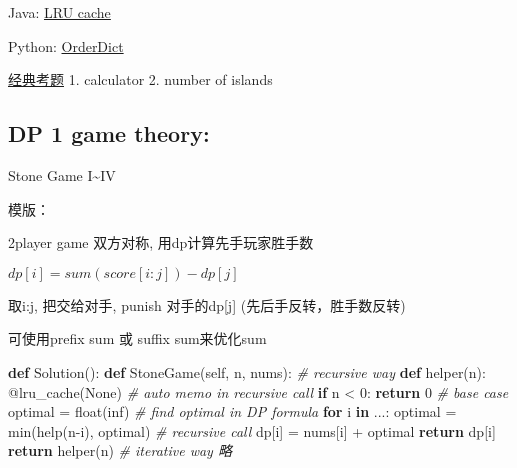 \documentclass[
]{article}
\author{}
\date{}
\newenvironment{Shaded}{}{}
\newcommand{\AttributeTok}[1]{\textcolor[rgb]{0.49,0.56,0.16}{#1}}
\newcommand{\BuiltInTok}[1]{#1}
\newcommand{\CommentTok}[1]{\textcolor[rgb]{0.38,0.63,0.69}{\textit{#1}}}
\newcommand{\ControlFlowTok}[1]{\textcolor[rgb]{0.00,0.44,0.13}{\textbf{#1}}}
\newcommand{\DecValTok}[1]{\textcolor[rgb]{0.25,0.63,0.44}{#1}}
\newcommand{\KeywordTok}[1]{\textcolor[rgb]{0.00,0.44,0.13}{\textbf{#1}}}
\newcommand{\NormalTok}[1]{#1}
\newcommand{\OperatorTok}[1]{\textcolor[rgb]{0.40,0.40,0.40}{#1}}
\newcommand{\StringTok}[1]{\textcolor[rgb]{0.25,0.44,0.63}{#1}}
\newcommand{\VariableTok}[1]{\textcolor[rgb]{0.10,0.09,0.49}{#1}}
\begin{document}
Java:
\href{https://medium.com/@krishankantsinghal/my-first-blog-on-medium-583159139237}{LRU
cache}

Python:
\href{https://docs.python.org/3/library/collections.html\#ordereddict-objects}{OrderDict}

\href{https://www.youtube.com/watch?v=qNRKPnOaUQE\&list=PLbaIOC0vpjNUg3b9zH14ikdknckN9hMMl}{经典考题}
1. calculator 2. number of islands

\hypertarget{dp-1-game-theory}{%
\subsection{\texorpdfstring{DP 1 game theory:
}{DP 1 game theory: }}\label{dp-1-game-theory}}

Stone Game I\textasciitilde IV

模版：

2player game 双方对称, 用dp计算先手玩家胜手数

\(dp[i] = sum(score[i:j]) - dp[j]\)

取i:j, 把交给对手, punish 对手的dp{[}j{]} (先后手反转，胜手数反转)

可使用prefix sum 或 suffix sum来优化sum

\begin{Shaded}
\begin{Highlighting}[]
\KeywordTok{def}\NormalTok{ Solution():}
  \KeywordTok{def}\NormalTok{ StoneGame(}\VariableTok{self}\NormalTok{, n, nums):}
    \CommentTok{\# recursive way}
    \KeywordTok{def}\NormalTok{ helper(n):}
      \AttributeTok{@lru\_cache}\NormalTok{(}\VariableTok{None}\NormalTok{)  }\CommentTok{\# auto memo in recursive call}
      \ControlFlowTok{if}\NormalTok{ n }\OperatorTok{\textless{}} \DecValTok{0}\NormalTok{: }\ControlFlowTok{return} \DecValTok{0}  \CommentTok{\# base case}
\NormalTok{      optimal }\OperatorTok{=} \BuiltInTok{float}\NormalTok{(}\StringTok{\textquotesingle{}inf\textquotesingle{}}\NormalTok{)  }\CommentTok{\# find optimal in DP formula}
      \ControlFlowTok{for}\NormalTok{ i }\KeywordTok{in}\NormalTok{ ...:}
\NormalTok{        optimal }\OperatorTok{=} \BuiltInTok{min}\NormalTok{(}\BuiltInTok{help}\NormalTok{(n}\OperatorTok{{-}}\NormalTok{i), optimal)  }\CommentTok{\# recursive call}
\NormalTok{      dp[i] }\OperatorTok{=}\NormalTok{ nums[i] }\OperatorTok{+}\NormalTok{ optimal}
			\ControlFlowTok{return}\NormalTok{ dp[i]}
   \ControlFlowTok{return}\NormalTok{ helper(n)}
		\CommentTok{\# iterative way 略}
\end{Highlighting}
\end{Shaded}
\end{document}
